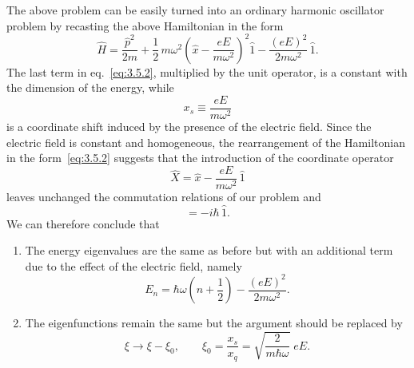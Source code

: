 The above problem can be easily turned into an ordinary harmonic
oscillator problem by recasting the above Hamiltonian in the form
\begin{equation}
\hat H=\frac{\hat p^2}{2m}+\frac{1}{2}\,m\omega^2
\left(\hat x-\frac{eE}{m\omega^2}\right)^2\hat 1
-\frac{(eE)^2}{2m\omega^2}\,\hat 1.
\label{eq:3.5.2}
\end{equation}
The last term in eq.~\eqref{eq:3.5.2}, multiplied by the unit
operator, is a constant with the dimension of the energy, while
\begin{equation}
x_s\equiv\frac{eE}{m\omega^2}
\label{eq:3.5.3}
\end{equation}
is a coordinate shift induced by the presence of the electric field.
Since the electric field is constant and homogeneous, the
rearrangement of the Hamiltonian in the form~\eqref{eq:3.5.2}
suggests that the introduction of the coordinate operator
\begin{equation}
\hat X=\hat x-\frac{eE}{m\omega^2}\,\hat 1
\label{eq:3.5.4}
\end{equation}
leaves unchanged the commutation relations of our problem and
\begin{equation}
[\hat p,\hat X]=-i\hbar\,\hat 1.
\label{eq:3.5.5}
\end{equation}
We can therefore conclude that
\begin{enumerate}
\item The energy eigenvalues are the same as before but with an
      additional term due to the effect of the electric field, namely
      \begin{equation}
      E_n=\hbar\omega\!\left(n+\frac{1}{2}\right)-\frac{(eE)^2}{2m\omega^2}.
      \label{eq:3.5.6}
      \end{equation}
\item The eigenfunctions remain the same but the argument should be
      replaced by
      \begin{equation}
      \xi\to\xi-\xi_0,\qquad
      \xi_0=\frac{x_s}{x_q}=\sqrt{\frac{2}{m\hbar\omega}}\;eE.
      \label{eq:3.5.7}
      \end{equation}
\end{enumerate}

